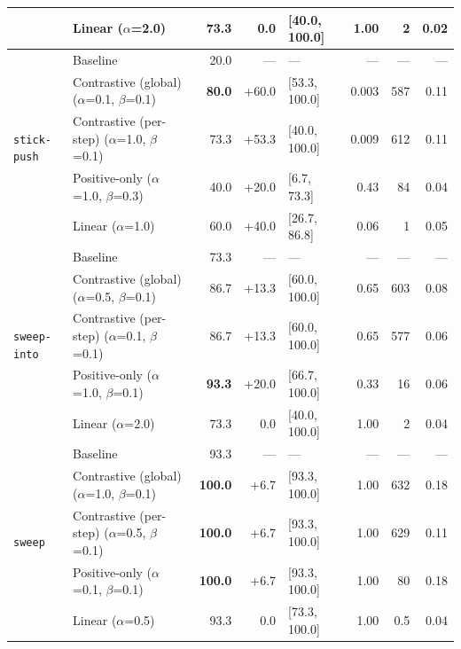 \begin{table}[p]
{\begin{tabular}{@{}ll r r l r r r@{}}
   & Linear \scriptsize{($\alpha$=2.0)} & 73.3 & 0.0 & [40.0, 100.0] & 1.00 & 2 & 0.02 \\
\midrule
  \multirow{5}{*}{\texttt{stick-push}} & Baseline & 20.0 & --- & --- & --- & --- & --- \\
   & Contrastive (global) \scriptsize{($\alpha$=0.1, $\beta$=0.1)} & \textbf{80.0} & +60.0 & [53.3, 100.0] & 0.003 & 587 & 0.11 \\
   & Contrastive (per-step) \scriptsize{($\alpha$=1.0, $\beta$=0.1)} & 73.3 & +53.3 & [40.0, 100.0] & 0.009 & 612 & 0.11 \\
   & Positive-only \scriptsize{($\alpha$=1.0, $\beta$=0.3)} & 40.0 & +20.0 & [6.7, 73.3] & 0.43 & 84 & 0.04 \\
   & Linear \scriptsize{($\alpha$=1.0)} & 60.0 & +40.0 & [26.7, 86.8] & 0.06 & 1 & 0.05 \\
\midrule
  \multirow{5}{*}{\texttt{sweep-into}} & Baseline & 73.3 & --- & --- & --- & --- & --- \\
   & Contrastive (global) \scriptsize{($\alpha$=0.5, $\beta$=0.1)} & 86.7 & +13.3 & [60.0, 100.0] & 0.65 & 603 & 0.08 \\
   & Contrastive (per-step) \scriptsize{($\alpha$=0.1, $\beta$=0.1)} & 86.7 & +13.3 & [60.0, 100.0] & 0.65 & 577 & 0.06 \\
   & Positive-only \scriptsize{($\alpha$=1.0, $\beta$=0.1)} & \textbf{93.3} & +20.0 & [66.7, 100.0] & 0.33 & 16 & 0.06 \\
   & Linear \scriptsize{($\alpha$=2.0)} & 73.3 & 0.0 & [40.0, 100.0] & 1.00 & 2 & 0.04 \\
\midrule
  \multirow{5}{*}{\texttt{sweep}} & Baseline & 93.3 & --- & --- & --- & --- & --- \\
   & Contrastive (global) \scriptsize{($\alpha$=1.0, $\beta$=0.1)} & \textbf{100.0} & +6.7 & [93.3, 100.0] & 1.00 & 632 & 0.18 \\
   & Contrastive (per-step) \scriptsize{($\alpha$=0.5, $\beta$=0.1)} & \textbf{100.0} & +6.7 & [93.3, 100.0] & 1.00 & 629 & 0.11 \\
   & Positive-only \scriptsize{($\alpha$=0.1, $\beta$=0.1)} & \textbf{100.0} & +6.7 & [93.3, 100.0] & 1.00 & 80 & 0.18 \\
   & Linear \scriptsize{($\alpha$=0.5)} & 93.3 & 0.0 & [73.3, 100.0] & 1.00 & 0.5 & 0.04 \\
\bottomrule
\end{tabular}}
\end{table}
